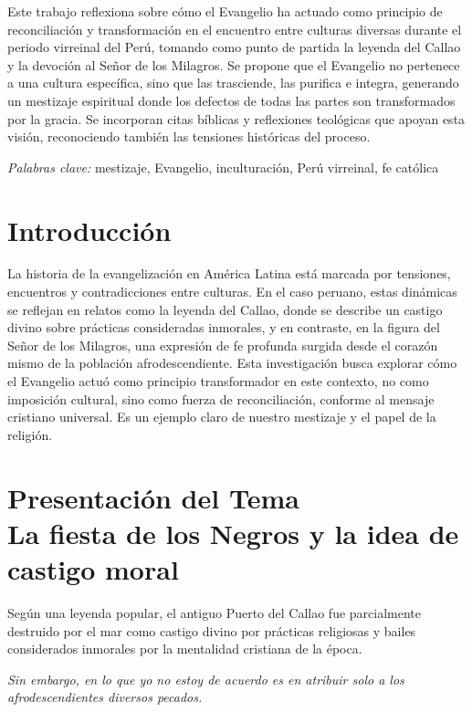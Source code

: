 \documentclass[a4paper,12pt]{article}
\begin{document}
	

\tableofcontents
\newpage
	
	\abstract
	Este trabajo reflexiona sobre cómo el Evangelio ha actuado como principio de reconciliación y transformación en el encuentro entre culturas diversas durante el periodo virreinal del Perú, tomando como punto de partida la leyenda del Callao y la devoción al Señor de los Milagros. Se propone que el Evangelio no pertenece a una cultura específica, sino que las trasciende, las purifica e integra, generando un mestizaje espiritual donde los defectos de todas las partes son transformados por la gracia. Se incorporan citas bíblicas y reflexiones teológicas que apoyan esta visión, reconociendo también las tensiones históricas del proceso.
	
	\textit{Palabras clave:} mestizaje, Evangelio, inculturación, Perú virreinal, fe católica
	
	
	\section*{Introducción}
	La historia de la evangelización en América Latina está marcada por tensiones, encuentros y contradicciones entre culturas. En el caso peruano, estas dinámicas se reflejan en relatos como la leyenda del Callao, donde se describe un castigo divino sobre prácticas consideradas inmorales, y en contraste, en la figura del Señor de los Milagros, una expresión de fe profunda surgida desde el corazón mismo de la población afrodescendiente. Esta investigación busca explorar cómo el Evangelio actuó como principio transformador en este contexto, no como imposición cultural, sino como fuerza de reconciliación, conforme al mensaje cristiano universal. Es un ejemplo claro de nuestro mestizaje y el papel de la religi\'on.
	
	\section{Presentaci\'on del Tema \\ La fiesta de los Negros y la idea de castigo moral}
	Según una leyenda popular, el antiguo Puerto del Callao fue parcialmente destruido por el mar como castigo divino por prácticas religiosas y bailes considerados inmorales por la mentalidad cristiana de la época. 
	
	\bigskip
	\noindent\textit{Sin embargo, en lo que yo no estoy de acuerdo es en atribuir solo a los afrodescendientes diversos pecados.}
	
\end{document}
